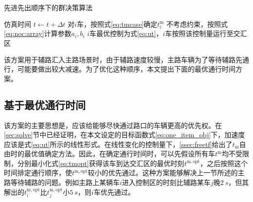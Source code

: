 \begin{algorithm}[htbp]
\caption{先进先出顺序下的群决策算法}
\label{alg:fifo}
\begin{algorithmic}
  \Statex
    \State 仿真时间 $t\gets t+\Delta t$
        \State 对$i$车，按照式\eqref{eq:tmcase}确定$t_i^\mathrm{m}$
        \State 不考虑约束，按照式\eqref{eq:noc:array}计算参数$a_i, b_i$
        \State $i$车最优控制为式\eqref{eq:ut}，$i$车按照该控制量运行至交汇区
      \EndFor
    \EndIf
  \EndWhile
\end{algorithmic}
\end{algorithm}

该方案用于辅路汇入主路场景时，由于辅路速度较慢，主路车辆为了等待辅路先通行，可能要做出较大减速。为了优化这种顺序，本文提出下面的最优通行时间方案。

\subsection{基于最优通行时间}
该方案的主要思想是，应该给能够尽快通过路口的车辆更高的优先权。在\ref{sec:solve}节中已经证明，在本文设定的目标函数式\eqref{eq:one_item_obj}下，加速度应该是式\eqref{eq:ut}所示的线性形式。在线性变化的控制量下，\ref{ssec:freetf}给出了$t_\mathrm{m}$自由时的最优值确定方法。因此，在确定通行时间时，可以先假设所有车$t^\mathrm{m}$均不受限制，分别最小化式\eqref{eq:tmopt}获得该车到达交汇区的最优时刻$t^\mathrm{m,opt}$，之后按照这个时间排定通行顺序，使$t^\mathrm{m,opt}$较小的优先通过。这种方案能够解决上一节所述的主路等待辅路的问题。例如主路上某辆车$i$进入控制区的时刻比辅路某车$j$晚$\SI{2}{s}$，但其解出的$t_i^\mathrm{m,opt}$比$t_j^\mathrm{m,opt}$小$\SI{5}{s}$，则$i$车优先通过。

